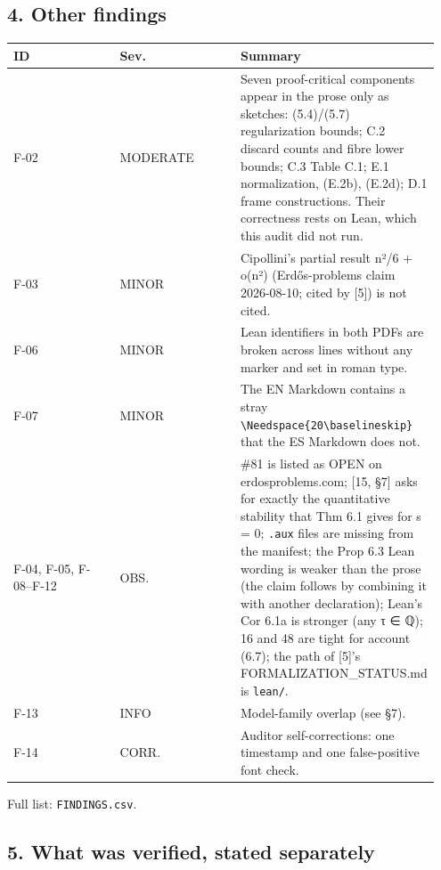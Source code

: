 \documentclass[10pt,a4paper]{article}
\begin{document}
\subsection*{4. Other findings}

{\small\begin{longtable}{p{0.317\linewidth}|p{0.317\linewidth}|p{0.317\linewidth}}
ID & Sev. & Summary \\ \hline
F-02 & MODERATE & Seven proof-critical components appear in the prose only as sketches: (5.4)/(5.7) regularization bounds; C.2 discard counts and fibre lower bounds; C.3 Table C.1; E.1 normalization, (E.2b), (E.2d); D.1 frame constructions. Their correctness rests on Lean, which this audit did not run. \\ \hline
F-03 & MINOR & Cipollini's partial result n²/6 + o(n²) (Erdős-problems claim 2026-08-10; cited by [5]) is not cited. \\ \hline
F-06 & MINOR & Lean identifiers in both PDFs are broken across lines without any marker and set in roman type. \\ \hline
F-07 & MINOR & The EN Markdown contains a stray \texttt{\textbackslash{}Needspace\{20\textbackslash{}baselineskip\}} that the ES Markdown does not. \\ \hline
F-04, F-05, F-08–F-12 & OBS. & \#81 is listed as OPEN on erdosproblems.com; [15, §7] asks for exactly the quantitative stability that Thm 6.1 gives for s = 0; \texttt{.aux} files are missing from the manifest; the Prop 6.3 Lean wording is weaker than the prose (the claim follows by combining it with another declaration); Lean's Cor 6.1a is stronger (any τ ∈ ℚ); 16 and 48 are tight for account (6.7); the path of [5]'s FORMALIZATION\_STATUS.md is \texttt{lean/}. \\ \hline
F-13 & INFO & Model-family overlap (see §7). \\ \hline
F-14 & CORR. & Auditor self-corrections: one timestamp and one false-positive font check. \\ \hline
\end{longtable}}

Full list: \texttt{FINDINGS.csv}.

\subsection*{5. What was verified, stated separately}
\end{document}
